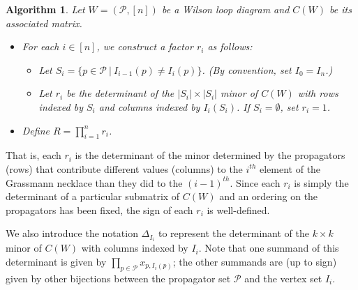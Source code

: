 \documentclass[11pt]{article}
\newcommand{\cP}{\mathcal{P}}
\newtheorem{algorithm}[thm]{Algorithm}
\theoremstyle{remark}
\theoremstyle{definition}
\begin{document}
\begin{algorithm}\label{alg WLD to denom via GN}
Let $W = (\cP, [n])$ be a Wilson loop diagram and $C(W)$ be its associated matrix. %
\begin{itemize}
  \item For each $i \in [n]$, we construct a factor $r_i$ as follows:
    \begin{itemize}
      \item Let $S_i = \{p \in \cP \ | \ I_{i-1}(p) \neq I_i(p)\}$. (By convention, set $I_{0} = I_n$.)
      \item Let $r_i$ be the determinant of the $|S_i|\times |S_i|$ minor of $C(W)$ with rows indexed by $S_i$ and columns indexed by $I_i(S_i)$.  If $S_i = \emptyset$, set $r_i = 1$. %
    \end{itemize}
  \item Define $R = \prod_{i=1}^n r_i$.
\end{itemize}
\end{algorithm}

That is, each $r_i$ is the determinant of the minor determined by the propagators (rows) that contribute different values (columns) to the $i^{th}$ element of the Grassmann necklace than they did to the $(i-1)^{th}$. Since each $r_i$ is simply the determinant of a particular submatrix of $C(W)$ and an ordering on the propagators has been fixed, the sign of each $r_i$ is well-defined.

We also introduce the notation $\Delta_{I_i}$ to represent the determinant of the $k\times k$ minor of $C(W)$ with columns indexed by $I_i$. Note that one summand of this determinant is given by $\prod_{p \in \cP}x_{p, I_i(p)}$; the other summands are (up to sign) given by other bijections between the propagator set $\cP$ and the vertex set $I_i$.
\end{document}
